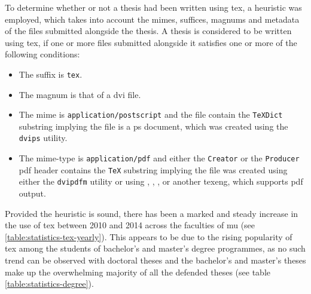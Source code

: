     To determine whether or not a thesis had been written using \gls{tex}, a heuristic was employed, which takes into account the \glspl{mime}, suffices, \glspl{magnum} and metadata of the files submitted alongside the thesis. A thesis is considered to be written using \gls{tex}, if one or more files submitted alongside it satisfies one or more of the following conditions:

    \begin{itemize}
      \item The suffix is \texttt{tex}.
      \item The \gls{magnum} is that of a \acrshort{dvi} file.
      \item The \gls{mime} is \texttt{application/postscript} and the file contain the \texttt{TeXDict} substring implying the file is a \gls{ps} document, which was created using the \texttt{dvips} utility.
      \item The mime-type is \texttt{application/pdf} and either the \texttt{Creator} or the \texttt{Producer} \gls{pdf} header contains the \texttt{TeX} substring implying the file was created using either the \texttt{dvipdfm} utility or using , , ,  or another \gls{texeng}, which supports \gls{pdf} output.
    \end{itemize}

    Provided the heuristic is sound, there has been a marked and steady increase in the use of \gls{tex} between 2010 and 2014 across the faculties of \gls{mu} (see \ref{table:statistics-tex-yearly}). This appears to be due to the rising popularity of \gls{tex} among the students of bachelor's and master's degree programmes, as no such trend can be observed with doctoral theses and the bachelor's and master's theses make up the overwhelming majority of all the defended theses (see table \ref{table:statistics-degree}).

